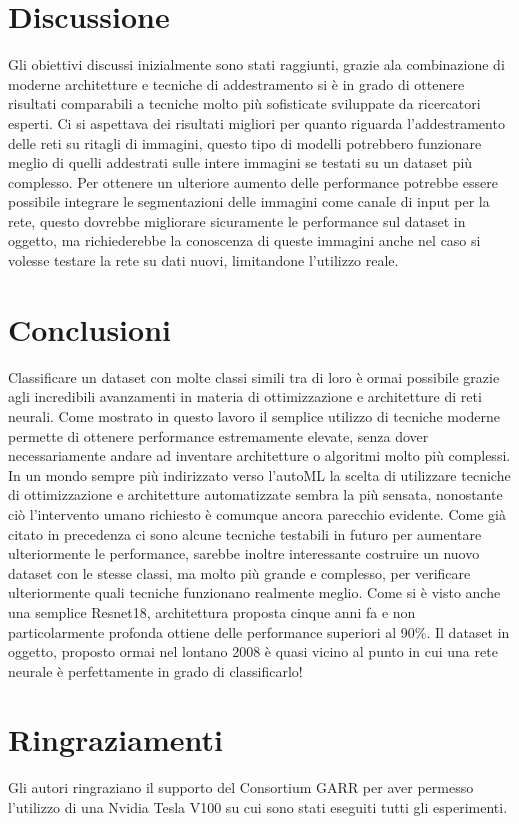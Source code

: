\section{Discussione}
Gli obiettivi discussi inizialmente sono stati raggiunti, grazie ala combinazione di moderne architetture e tecniche di addestramento si è in grado di ottenere risultati comparabili a tecniche molto più sofisticate sviluppate da ricercatori esperti. Ci si aspettava dei risultati migliori per quanto riguarda l'addestramento delle reti su ritagli di immagini, questo tipo di modelli potrebbero funzionare meglio di quelli addestrati sulle intere immagini se testati su un dataset più complesso. Per ottenere un ulteriore aumento delle performance potrebbe essere possibile integrare le segmentazioni delle immagini come canale di input per la rete, questo dovrebbe migliorare sicuramente le performance sul dataset in oggetto, ma richiederebbe la conoscenza di queste immagini anche nel caso si volesse testare la rete su dati nuovi, limitandone l'utilizzo reale.
\newpage
\section{Conclusioni}
Classificare un dataset con molte classi simili tra di loro è ormai possibile grazie agli incredibili avanzamenti in materia di ottimizzazione e architetture di reti neurali. Come mostrato in questo lavoro il semplice utilizzo di tecniche moderne permette di ottenere performance estremamente elevate, senza dover necessariamente andare ad inventare architetture o algoritmi molto più complessi. In un mondo sempre più indirizzato verso l'autoML la scelta di utilizzare tecniche di ottimizzazione e architetture automatizzate sembra la più sensata, nonostante ciò l'intervento umano richiesto è comunque ancora parecchio evidente. Come già citato in precedenza ci sono alcune tecniche testabili in futuro per aumentare ulteriormente le performance, sarebbe inoltre interessante costruire un nuovo dataset con le stesse classi, ma molto più grande e complesso, per verificare ulteriormente quali tecniche funzionano realmente meglio. Come si è visto anche una semplice Resnet18, architettura proposta cinque anni fa e non particolarmente profonda ottiene delle performance superiori al 90\%. Il dataset in oggetto, proposto ormai nel lontano 2008 è quasi vicino al punto in cui una rete neurale è perfettamente in grado di classificarlo!

\section*{Ringraziamenti}
Gli autori ringraziano il supporto del Consortium GARR per aver permesso l'utilizzo di una Nvidia Tesla V100 su cui sono stati eseguiti tutti gli esperimenti.
\newpage



